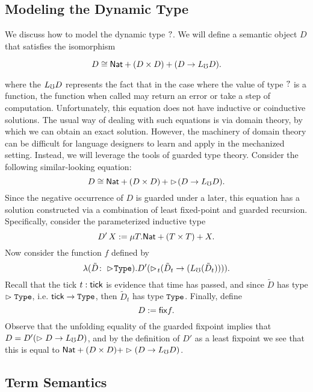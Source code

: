 

\subsection{Modeling the Dynamic Type}\label{sec:dynamic-type}

We discuss how to model the dynamic type $?$.
We will define a semantic object $D$ that satisfies the isomorphism

\[ D \cong \mathsf{Nat} + (D \times D) + (D \to L_\mho D). \]

where the $L_\mho D$ represents the fact that in the case where the value of type
$?$ is a function, the function when called may return an error or take a
step of computation. Unfortunately, this equation does not have inductive or
coinductive solutions. The usual way of dealing with such equations is via
domain theory, by which we can obtain an exact solution. However, the machinery
of domain theory can be difficult for language designers to learn and apply in
the mechanized setting. Instead, we will leverage the tools of guarded type
theory. Consider the following similar-looking equation:
%
\[ D \cong \mathsf{Nat} + (D \times D)\, + \vartriangleright \hspace{-0.2em} (D \to L_\mho D). \]
%
Since the negative occurrence of $D$ is guarded under a later, this equation has
a solution constructed via a combination of least fixed-point and guarded
recursion. Specifically, consider the parameterized inductive type
%
\[ D'\, X := \mu T. \mathsf{Nat} + (T \times T) + X. \]
%
Now consider the function $f$ defined by
%
\[ \lambda (\tilde{D} \colon \vartriangleright \hspace{-0.2em} \texttt{Type}) . D' (\vartriangleright \hspace{-0.2em}_t (\tilde{D}_t \to (L_\mho (\tilde{D}_t)))). \]
%
Recall that the tick $t : \mathsf{tick}$ is evidence that time has passed, and since
$\tilde{D}$ has type $\vartriangleright \texttt{Type}$, i.e. $\mathsf{tick} \to \texttt{Type}$, then $\tilde{D}_t$
has type $\texttt{Type}$.
%
Finally, define 
\[ D := \mathsf{fix} f. \]
%
Observe that the unfolding equality of the guarded fixpoint implies that $D = D'
(\vartriangleright D \to L_\mho D)$, and by the definition of $D'$ as a least fixpoint we see
that this is equal to $\mathsf{Nat} + (D \times D) + \vartriangleright (D \to L_\mho D)$.


\subsection{Term Semantics}\label{sec:term-interpretation}

